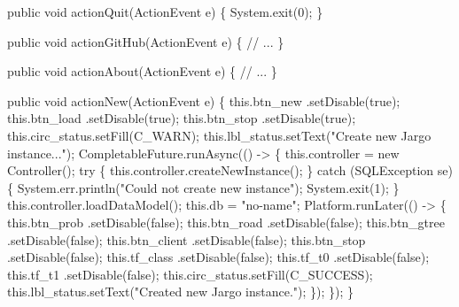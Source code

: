 \nwenddocs{}\endmoddef{}
public void actionQuit(ActionEvent e) \{
  System.exit(0);
\}
\nwendcode{}\nwdocspar

\nwenddocs{}\endmoddef{}
public void actionGitHub(ActionEvent e) \{
  // ...
\}
\nwendcode{}\nwdocspar

\nwenddocs{}\endmoddef{}
public void actionAbout(ActionEvent e) \{
  // ...
\}
\nwendcode{}\nwdocspar

\nwenddocs{}\endmoddef{}
public void actionNew(ActionEvent e) \{
  this.btn_new      .setDisable(true);
  this.btn_load     .setDisable(true);
  this.btn_stop     .setDisable(true);
  this.circ_status.setFill(C_WARN);
  this.lbl_status.setText("Create new Jargo instance...");
  CompletableFuture.runAsync(() -> \{
    this.controller = new Controller();
    try \{
      this.controller.createNewInstance();
    \} catch (SQLException se) \{
      System.err.println("Could not create new instance");
      System.exit(1);
    \}
    this.controller.loadDataModel();
    this.db = "no-name";
    Platform.runLater(() -> \{
      this.btn_prob     .setDisable(false);
      this.btn_road     .setDisable(false);
      this.btn_gtree    .setDisable(false);
      this.btn_client   .setDisable(false);
      this.btn_stop     .setDisable(false);
      this.tf_class     .setDisable(false);
      this.tf_t0        .setDisable(false);
      this.tf_t1        .setDisable(false);
      this.circ_status.setFill(C_SUCCESS);
      this.lbl_status.setText("Created new Jargo instance.");
    \});
  \});
\}
\nwendcode{}\nwdocspar

